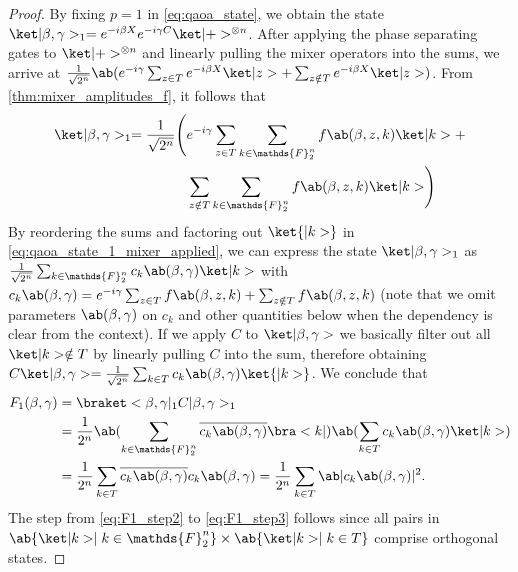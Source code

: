 \begin{proof}
  By fixing $p = 1$ in \cref{eq:qaoa_state}, we obtain the state $\ket|\mangle, \pangle>_1 = e^{-i \mangle X} e^{-i \pangle C} \ket|+>^{\otimes n}$. After applying the phase separating gates to $\ket|+>^{\otimes n}$ and linearly pulling the mixer operators into the sums, we arrive at $\frac{1}{\sqrt{2^n}} \ab(e^{-i \pangle} \sum_{z \in T} e^{-i \mangle X} \ket|z> + \sum_{z \notin T} e^{-i \mangle X} \ket|z>)$. From \cref{thm:mixer_amplitudes_f}, it follows that
  \begin{equation}
  \begin{aligned}
    \label{eq:qaoa_state_1_mixer_applied}
    \ket|\mangle, \pangle>_1 = \frac{1}{\sqrt{2^n}} \Biggl(&e^{-i \pangle} \sum_{z \in T} \sum_{k \in \mathds{F}_2^n} f\ab(\mangle, z, k) \ket|k> + \\
                                                         &\sum_{z \notin T} \sum_{k \in \mathds{F}_2^n} f\ab(\mangle, z, k) \ket|k>\Biggr)  
  \end{aligned}
  \end{equation}
    By reordering the sums and factoring out $\ket{|k>}$ in \cref{eq:qaoa_state_1_mixer_applied}, we can express the state $\ket|\mangle, \pangle>_1$ as $\frac{1}{\sqrt{2^n}} \sum_{k \in \mathds{F}_2^n} c_k\ab(\mangle,\pangle) \ket|k>$ with $c_k\ab(\mangle,\pangle) = e^{-i \pangle} \sum_{z \in T} f\ab(\mangle, z, k) + \sum_{z \notin T} f\ab(\mangle, z, k)$
    (note that we omit parameters \(\ab(\mangle, \pangle)\) on \(c_{k}\) and other quantities below when the dependency is clear from the context). If we apply $C$ to $\ket|\mangle, \pangle>$ we basically filter out all $\ket|k> \notin T$ by linearly pulling $C$ into the sum, therefore obtaining $C \ket|\mangle, \pangle> = \frac{1}{\sqrt{2^n}} \sum_{k \in T} c_k\ab(\mangle,\pangle) \ket{|k>}$. We conclude that
  \begin{align}
    F_1(\mangle, \pangle) &=
    \braket<\mangle, \pangle|_1 C |\mangle, \pangle>_1\nonumber\\
    &= \frac{1}{2^n} \ab(\sum_{k \in \mathds{F}_2^n} \cconj{c_k\ab(\mangle,\pangle)} \bra<k|) \ab(\sum_{k \in T} c_k\ab(\mangle,\pangle) \ket|k>)\label{eq:F1_step2}\\ 
    &= \frac{1}{2^n} \sum_{k \in T} \cconj{c_k\ab(\mangle,\pangle)} c_k\ab(\mangle,\pangle) = \frac{1}{2^n} \sum_{k \in T} \ab|c_k\ab(\mangle,\pangle)|^2.\label{eq:F1_step3}
  \end{align}
    The step from \cref{eq:F1_step2} to \cref{eq:F1_step3} follows since all pairs in $\ab\{\ket|k> \mid k \in \mathds{F}_2^n\} \times \ab\{\ket|k> \mid k \in T\}$ comprise orthogonal states. 

\end{proof}
